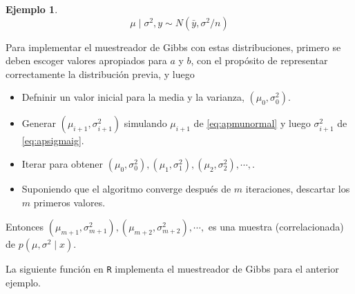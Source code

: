 \documentclass[
  10pt,
  spanish,
]{book}
\providecommand{\tightlist}{%
  \setlength{\itemsep}{0pt}\setlength{\parskip}{0pt}}
\theoremstyle{definition}
\theoremstyle{definition}
\newtheorem{example}{Ejemplo}[chapter]
\theoremstyle{definition}
\theoremstyle{definition}
\theoremstyle{remark}
\begin{document}
\begin{example}
\begin{equation}  
\label{eq:apsigmaig}
\mu\mid\sigma^2,y\sim N(\bar{y},\sigma^2/n)
\end{equation}

Para implementar el muestreador de Gibbs con estas distribuciones, primero se deben escoger valores apropiados para \(a\) y \(b\), con el propósito de representar correctamente la
distribución previa, y luego

\begin{itemize}
\tightlist
\item
  Defninir un valor inicial para la media y la varianza, \((\mu_0, \sigma^2_0)\).
\item
  Generar \((\mu_{i+1}, \sigma_{i+1}^2)\) simulando \(\mu_{i+1}\) de \eqref{eq:apmunormal} y luego \(\sigma^2_{i+1}\) de \eqref{eq:apsigmaig}.
\item
  Iterar para obtener \((\mu_0, \sigma^2_0), (\mu_1, \sigma^2_1), (\mu_2, \sigma^2_2),\cdots,\).
\item
  Suponiendo que el algoritmo converge después de
  \(m\) iteraciones, descartar los \(m\) primeros valores.
\end{itemize}

Entonces \((\mu_{m+1}, \sigma^2_{m+1}), (\mu_{m+2}, \sigma^2_{m+2}),\cdots,\) es
una muestra (correlacionada) de \(p(\mu, \sigma^2\mid x)\).
\end{example}

La siguiente función en \texttt{R} implementa el muestreador de Gibbs para el anterior ejemplo.
\end{document}
